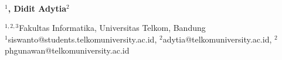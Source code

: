  
  \begin{center}
      \textbf{\large \Title}\\
      \bigskip 
  \end{center}
  
  
  
   \begin{center}
     \bf \Author$^1$, Didit Adytia$^2$
  \end{center}
  
   \begin{center}
     $^{1,2,3}$Fakultas Informatika, Universitas Telkom, Bandung\\
$^1$siswanto@students.telkomuniversity.ac.id, $^2$adytia@telkomuniversity.ac.id, $^2$phgunawan@telkomuniversity.ac.id
  \end{center}
  
   
   

